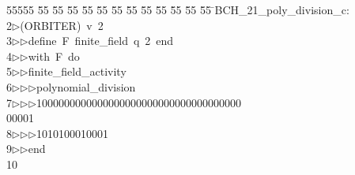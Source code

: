 %
%
\begin{tabbing}
55555 \= 55 \= 55 \= 55 \= 55 \= 55 \= 55 \= 55 \= 55 \= 55 \= 55 \= 55 \= 55 \= \>BCH\_21\_poly\_division\_c:\\[0pt]
2\>$\triangleright$\>(ORBITER)\ v\ 2\ \\[0pt]
3\>$\triangleright$\>$\triangleright$\>define\ F\ finite\_field\ q\ 2\ end\ \\[0pt]
4\>$\triangleright$\>$\triangleright$\>with\ F\ do\ \\[0pt]
5\>$\triangleright$\>$\triangleright$\>finite\_field\_activity\ \\[0pt]
6\>$\triangleright$\>$\triangleright$\>$\triangleright$\>polynomial\_division\ \\[0pt]
7\>$\triangleright$\>$\triangleright$\>$\triangleright$\>1000000000000000000000000000000000000\\[0pt]
00001\ \\[0pt]
8\>$\triangleright$\>$\triangleright$\>$\triangleright$\>1010100010001\ \\[0pt]
9\>$\triangleright$\>$\triangleright$\>end\\[0pt]
10\>\end{tabbing}
